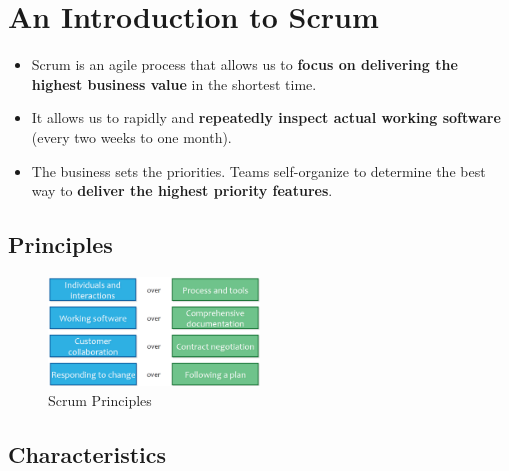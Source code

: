\hypertarget{an-introduction-to-scrum}{%
\section{An Introduction to Scrum}\label{an-introduction-to-scrum}}

\begin{itemize}
\tightlist
\item
  Scrum is an agile process that allows us to \textbf{focus on
  delivering the highest business value} in the shortest time.
\item
  It allows us to rapidly and \textbf{repeatedly inspect actual working
  software} (every two weeks to one month).
\item
  The business sets the priorities. Teams self-organize to determine the
  best way to \textbf{deliver the highest priority features}.
\end{itemize}




\hypertarget{Principles}{%
\subsection{Principles}\label{Principles}}
\begin{figure}[H]
\centering
\includegraphics[width=0.5\textwidth]{figures/ScrumPrinciples.png}
\caption{Scrum Principles}
\end{figure}






\hypertarget{characteristics}{%
\subsection{Characteristics}\label{characteristics}}

